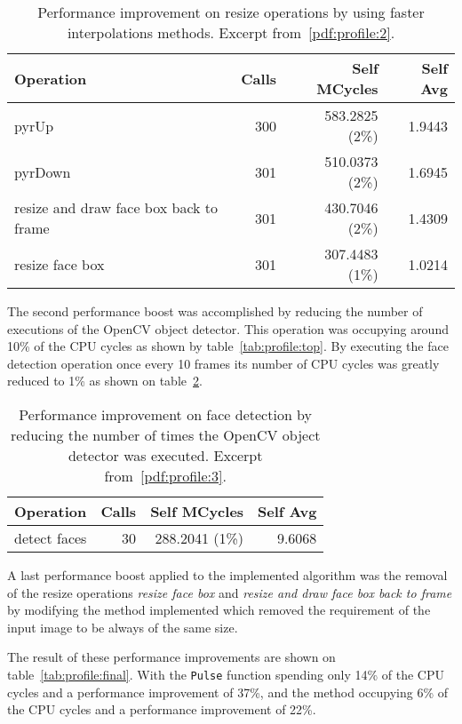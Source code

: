 \begin{table}
  \centering
  \begin{tabular}{lrrr}
    \hline
    Operation & Calls & Self MCycles & Self Avg \\
    \hline
    pyrUp                                   & 300 & 583.2825 (2\%) & 1.9443 \\
    pyrDown                                 & 301 & 510.0373 (2\%) & 1.6945 \\
    resize and draw face box back to frame  & 301 & 430.7046 (2\%) & 1.4309 \\
    resize face box                         & 301 & 307.4483 (1\%) & 1.0214 \\
    \hline
  \end{tabular}
  \caption{
    Performance improvement on resize operations by using faster interpolations
    methods. Excerpt from~\ref{pdf:profile:2}.
  }
  \label{tab:profile:resize}
\end{table}

The second performance boost was accomplished by reducing the number of
executions of the OpenCV object detector. This operation was occupying
around 10\% of the CPU cycles as shown by table~\ref{tab:profile:top}.
By executing the face detection operation once every 10 frames its number
of CPU cycles was greatly reduced to 1\% as shown on
table~\ref{tab:profile:face}.

\begin{table}
  \centering
  \begin{tabular}{lrrr}
    \hline
    Operation & Calls & Self MCycles & Self Avg \\
    \hline
    detect faces &  30 & 288.2041 (1\%) & 9.6068 \\
    \hline
  \end{tabular}
  \caption{
    Performance improvement on face detection by reducing the number of times
    the OpenCV object detector was executed. Excerpt from~\ref{pdf:profile:3}.
  }
  \label{tab:profile:face}
\end{table}

A last performance boost applied to the implemented algorithm was the removal of
the resize operations \emph{resize face box} and
\emph{resize and draw face box back to frame} by modifying the \evm{} method
implemented which removed the requirement of the input image to be always of the
same size.

The result of these performance improvements are shown on
table~\ref{tab:profile:final}. With the \texttt{Pulse} function spending
only 14\% of the CPU cycles and a performance improvement of 37\%,
and the \evm{} method occupying 6\% of the CPU cycles and a performance
improvement of 22\%.

